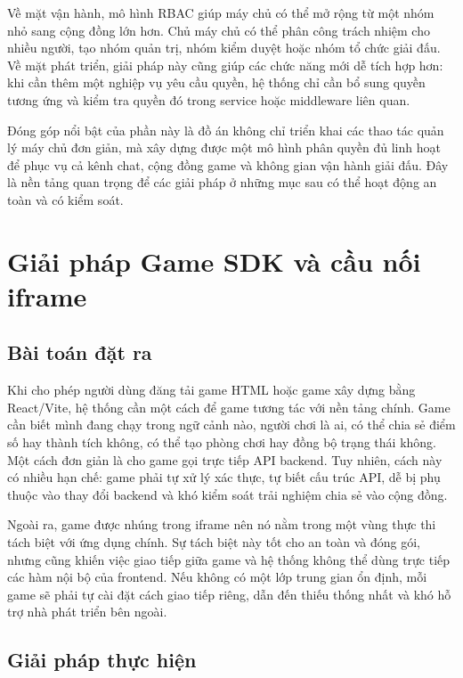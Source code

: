 Về mặt vận hành, mô hình RBAC giúp máy chủ có thể mở rộng từ một nhóm nhỏ sang cộng đồng lớn hơn. Chủ máy chủ có thể phân công trách nhiệm cho nhiều người, tạo nhóm quản trị, nhóm kiểm duyệt hoặc nhóm tổ chức giải đấu. Về mặt phát triển, giải pháp này cũng giúp các chức năng mới dễ tích hợp hơn: khi cần thêm một nghiệp vụ yêu cầu quyền, hệ thống chỉ cần bổ sung quyền tương ứng và kiểm tra quyền đó trong service hoặc middleware liên quan.

Đóng góp nổi bật của phần này là đồ án không chỉ triển khai các thao tác quản lý máy chủ đơn giản, mà xây dựng được một mô hình phân quyền đủ linh hoạt để phục vụ cả kênh chat, cộng đồng game và không gian vận hành giải đấu. Đây là nền tảng quan trọng để các giải pháp ở những mục sau có thể hoạt động an toàn và có kiểm soát.

\section{Giải pháp Game SDK và cầu nối iframe}
\label{section:5.2}

\subsection{Bài toán đặt ra}
\label{subsection:5.2.1}

Khi cho phép người dùng đăng tải game HTML hoặc game xây dựng bằng React/Vite, hệ thống cần một cách để game tương tác với nền tảng chính. Game cần biết mình đang chạy trong ngữ cảnh nào, người chơi là ai, có thể chia sẻ điểm số hay thành tích không, có thể tạo phòng chơi hay đồng bộ trạng thái không. Một cách đơn giản là cho game gọi trực tiếp API backend. Tuy nhiên, cách này có nhiều hạn chế: game phải tự xử lý xác thực, tự biết cấu trúc API, dễ bị phụ thuộc vào thay đổi backend và khó kiểm soát trải nghiệm chia sẻ vào cộng đồng.

Ngoài ra, game được nhúng trong iframe nên nó nằm trong một vùng thực thi tách biệt với ứng dụng chính. Sự tách biệt này tốt cho an toàn và đóng gói, nhưng cũng khiến việc giao tiếp giữa game và hệ thống không thể dùng trực tiếp các hàm nội bộ của frontend. Nếu không có một lớp trung gian ổn định, mỗi game sẽ phải tự cài đặt cách giao tiếp riêng, dẫn đến thiếu thống nhất và khó hỗ trợ nhà phát triển bên ngoài.

\subsection{Giải pháp thực hiện}
\label{subsection:5.2.2}

